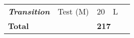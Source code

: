 \begin{table}[hbtp]
\begin{tabular}{|ll|ll|l}
\multicolumn{1}{|l|}{\multirow{-2}{*}{\textit{\textbf{Transition}}}}                                                                              & Test (M)                                                      & \multicolumn{1}{l|}{20}                              & L                               &                          \\ \cline{1-4}
\multicolumn{2}{|l|}{\textbf{Total}}                                                                                                                                                                              & \multicolumn{2}{l|}{\textbf{217}}                                                      &                          \\ \cline{1-4}
\end{tabular}
\end{table}

